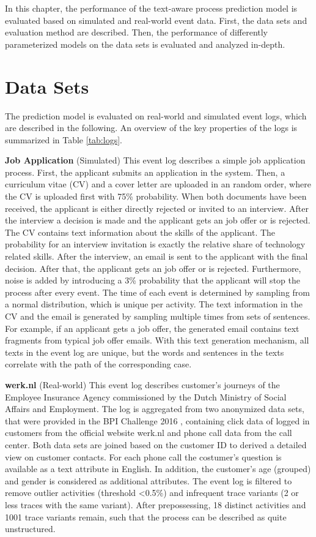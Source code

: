 In this chapter, the performance of the text-aware process prediction model is evaluated based on simulated and real-world event data.
First, the data sets and evaluation method are described. Then, the performance of differently parameterized models on the data sets is evaluated and analyzed in-depth.


\section{Data Sets}

The prediction model is evaluated on real-world and simulated event logs, which are described in the following. An overview of the key properties of the logs is summarized in Table \ref{tab:logs}.

\textbf{Job Application} (Simulated) This event log describes a simple job application process. 
First, the applicant submits an application in the system.
Then, a curriculum vitae (CV) and a cover letter are uploaded in an random order, where the CV is uploaded first with 75\% probability.
When both documents have been received, the applicant is either directly rejected or invited to an interview.
After the interview a decision is made and the applicant gets an job offer or is rejected.
The CV contains text information about the skills of the applicant.
The probability for an interview invitation is exactly the relative share of technology related skills.
After the interview, an email is sent to the applicant with the final decision.
After that, the applicant gets an job offer or is rejected.
Furthermore, noise is added by introducing a 3\% probability that the applicant will stop the process after every event.
The time of each event is determined by sampling from a normal distribution, which is unique per activity.
The text information in the CV and the email is generated by sampling multiple times from sets of sentences.
For example, if an applicant gets a job offer, the generated email contains text fragments from typical job offer emails.
With this text generation mechanism, all texts in the event log are unique, but the words and sentences in the texts correlate with the path of the corresponding case.

\textbf{werk.nl} (Real-world) This event log describes customer's journeys of the Employee Insurance Agency commissioned by the Dutch Ministry of Social Affairs and Employment. The log is aggregated from two anonymized data sets, that were provided in the BPI Challenge 2016 \cite{bpichallenge2016}, containing click data of logged in customers from the official website werk.nl and phone call data from the call center.
Both data sets are joined based on the customer ID to derived a detailed view on customer contacts.
For each phone call the costumer's question is available as a text attribute in English. In addition, the customer's age (grouped) and gender is considered as additional attributes.
The event log is filtered to remove outlier activities (threshold <0.5\%) and infrequent trace variants (2 or less traces with the same variant). After prepossessing, 18 distinct activities and 1001 trace variants remain, such that the process can be described as quite unstructured.

